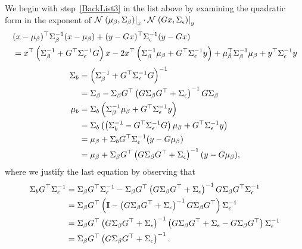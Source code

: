 We begin with step~\ref{BackList3} in the list above by examining the
quadratic form in the exponent of
${\mathcal{N}}\left.\left(\mu_\beta,\Sigma_\beta\right)\right|_{x} \cdot
{\mathcal{N}}\left.\left(Gx,\Sigma_\epsilon\right)\right|_{y}$
\begin{align*}
  &(x-\mu_\beta)^\top \Sigma_\beta^{-1} (x-\mu_\beta) +
  (y-Gx)^\top \Sigma_\epsilon^{-1} (y-Gx) \\
  &= x^\top \left(\Sigma_\beta^{-1} + G^\top
    \Sigma_\epsilon^{-1} G \right) x - 2x^\top
  \left(\Sigma_\beta^{-1}\mu_\beta + G^\top \Sigma_\epsilon^{-1}
    y \right) + \mu_\beta ^\top \Sigma_\beta^{-1}\mu_\beta +
  y^\top \Sigma_\epsilon^{-1} y
\end{align*}
\begin{align*}
  \Sigma_b &= \left( \Sigma_\beta^{-1} + G^\top
    \Sigma_\epsilon^{-1} G \right)^{-1}\\
  &= \Sigma_\beta - \Sigma_\beta G^\top \left(G \Sigma_\beta
    G^\top + \Sigma_\epsilon \right)^{-1} G \Sigma_\beta\\
  \mu_b &= \Sigma_b \left(\Sigma_\beta^{-1}\mu_\beta + G^\top
    \Sigma_\epsilon^{-1} y \right) \\
  &= \Sigma_b \left( \left( \Sigma_b^{-1} - G^\top
      \Sigma_\epsilon^{-1} G \right) \mu_\beta + G^\top
    \Sigma_\epsilon^{-1} y \right)\\
  &= \mu_\beta + \Sigma_b G^\top \Sigma_\epsilon^{-1}
  (y-G\mu_\beta) \\
  &= \mu_\beta + \Sigma_\beta G^\top \left(G \Sigma_\beta
    G^\top + \Sigma_\epsilon \right)^{-1}(y-G\mu_\beta),
\end{align*}
where we justify the last equation by observing that
\begin{align*}
  \Sigma_b G^\top \Sigma_\epsilon^{-1} &= \Sigma_\beta
  G^\top \Sigma_\epsilon^{-1} - \Sigma_\beta G^\top \left(G
    \Sigma_\beta G^\top + \Sigma_\epsilon \right)^{-1}G
  \Sigma_\beta
  G^\top \Sigma_\epsilon^{-1} \\
  &= \Sigma_\beta G^\top \left( {\bf I} - \left(G \Sigma_\beta
      G^\top + \Sigma_\epsilon \right)^{-1}G \Sigma_\beta
    G^\top \right)\Sigma_\epsilon^{-1} \\
  &= \Sigma_\beta G^\top \left(G \Sigma_\beta G^\top +
    \Sigma_\epsilon \right)^{-1} \left(G \Sigma_\beta G^\top +
    \Sigma_\epsilon - G \Sigma_\beta G^\top
  \right)\Sigma_\epsilon^{-1}\\
  &= \Sigma_\beta G^\top \left(G \Sigma_\beta G^\top +
    \Sigma_\epsilon \right)^{-1}.
\end{align*}
